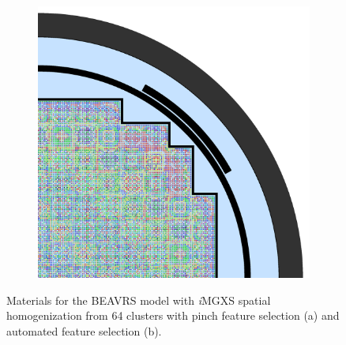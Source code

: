 \begin{figure}[h!]
\begin{subfigure}{0.68\textwidth}
  \includegraphics[width=\linewidth]{figures/unsupervised/geometries/with-features/64-clusters/combined/full-core}
  \caption{}
  \label{fig:chap10-full-core-combined-64}
\end{subfigure}
\caption[Materials for BEAVRS with clustering homogenization (64 clusters)]{Materials for the \ac{BEAVRS} model with \textit{i}\ac{MGXS} spatial homogenization from 64 clusters with pinch feature selection (a) and automated feature selection (b).}
\label{fig:chap10-full-core-geometries-64}
\end{figure}

\clearpage